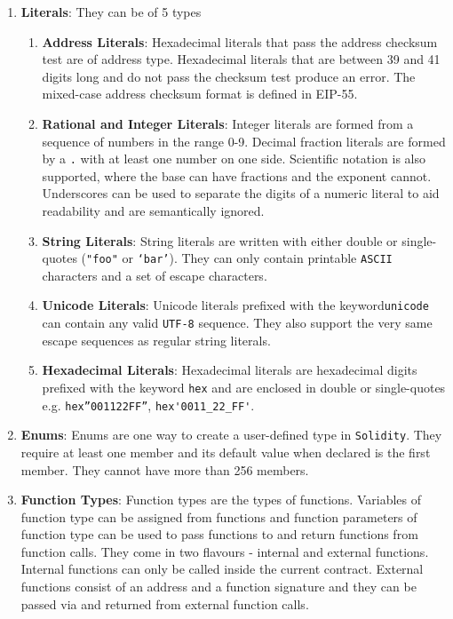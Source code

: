 \begin{enumerate}
\item\textbf{Literals}: They can be of 5 types
    \begin{enumerate}
    \item\textbf{Address Literals}: Hexadecimal literals that pass the address checksum test are of address type. Hexadecimal literals that are between 39 and 41 digits long and do not pass the checksum test produce an error. The mixed-case address checksum format is defined in EIP-55.
    \item\textbf{Rational and Integer Literals}: Integer literals are formed from a sequence of numbers in the range 0-9. Decimal fraction literals are formed by a \verb|.| with at least one number on one side. Scientific notation is also supported, where the base can have fractions and the exponent cannot. Underscores can be used to separate the digits of a numeric literal to aid readability and are semantically ignored.
    \item\textbf{String Literals}: String literals are written with either double or single-quotes (\verb|"foo"| or \verb|‘bar’|). They can only contain printable \verb|ASCII| characters and a set of escape characters.
    \item\textbf{Unicode Literals}: Unicode literals prefixed with the keyword\linebreak\verb|unicode| can contain any valid \verb|UTF-8| sequence. They also support the very same escape sequences as regular string literals.
    \item\textbf{Hexadecimal Literals}: Hexadecimal literals are hexadecimal digits prefixed with the keyword \verb|hex| and are enclosed in double or single-quotes e.g. \verb|hex”001122FF”|, \verb|hex'0011_22_FF'|.
    \end{enumerate}

\item\textbf{Enums}: Enums are one way to create a user-defined type in \verb|Solidity|. They require at least one member and its default value when declared is the first member. They cannot have more than 256 members.

\item\textbf{Function Types}: Function types are the types of functions. Variables of function type can be assigned from functions and function parameters of function type can be used to pass functions to and return functions from function calls.  They come in two flavours - internal and external functions. Internal functions can only be called inside the current contract. External functions consist of an address and a function signature and they can be passed via and returned from external function calls.


\end{enumerate}
